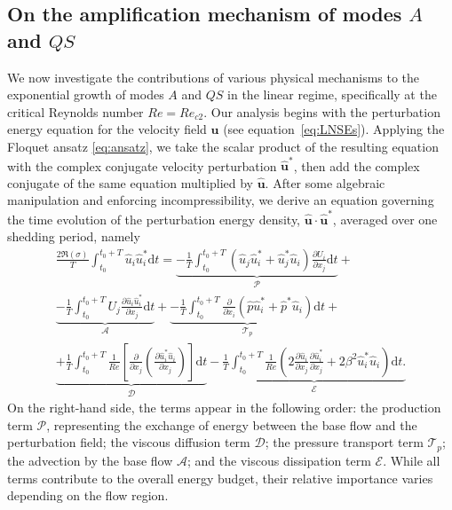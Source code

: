 \subsection{On the amplification mechanism of modes $A$ and $QS$}

We now investigate the contributions of various physical mechanisms to the exponential growth of modes $A$ and $QS$ in the linear regime, specifically at the critical Reynolds number $Re = Re_{c2}$. Our analysis begins with the perturbation energy equation for the velocity field $\bm{u}$ (see equation~\eqref{eq:LNSEs}). Applying the Floquet ansatz \eqref{eq:ansatz}, we take the scalar product of the resulting equation with the complex conjugate velocity perturbation $\hat{\bm{u}}^*$, then add the complex conjugate of the same equation multiplied by $\hat{\bm{u}}$. After some algebraic manipulation and enforcing incompressibility, we derive an equation governing the time evolution of the perturbation energy density, $\hat{\bm{u}} \cdot \hat{\bm{u}}^*$, averaged over one shedding period, namely
%
\begin{equation}
  \begin{gathered}
  \frac{2 \Re(\sigma)}{T} \int_{t_0}^{t_0+T} \hat{u}_i \hat{u}_i^* \text{d}t = 
 \underbrace{-\frac{1}{T} \int_{t_0}^{t_0+T} \left( \hat{u}_j \hat{u}_i^* + \hat{u}_j^* \hat{u}_i \right) \frac{\partial U_i}{\partial x_j} \text{d} t}_{\mathcal{P}} +\\
 \underbrace{-\frac{1}{T} \int_{t_0}^{t_0+T} U_j \frac{\partial \hat{u}_i \hat{u}_i^*}{\partial x_j} \text{d} t }_{\mathcal{A}} + 
 \underbrace{-\frac{1}{T} \int_{t_0}^{t_0+T} \frac{\partial}{\partial x_i} \left( \hat{p} \hat{u}_i^* + \hat{p}^* \hat{u}_i \right) \text{d}t }_{\mathcal{T}_p}+ \\
\underbrace{ +\frac{1}{T} \int_{t_0}^{t_0+T} \frac{1}{Re} \left[ \frac{\partial}{\partial x_j} \left( \frac{\partial \hat{u}_i^* \hat{u}_i }{\partial x_j} \right) \right] \text{d}t }_{\mathcal{D} }
 - \underbrace{ \frac{1}{T} \int_{t_0}^{t_0+T} \frac{1}{Re} \left( 2 \frac{\partial \hat{u}_i}{\partial x_j} \frac{\partial \hat{u}_i^*}{\partial x_j} + 2 \beta^2 \hat{u}_i^* \hat{u}_i \right) \text{d} t. }_{\mathcal{E}}
 \end{gathered}
\end{equation}
%
On the right-hand side, the terms appear in the following order: the production term $\mathcal{P}$, representing the exchange of energy between the base flow and the perturbation field; the viscous diffusion term $\mathcal{D}$; the pressure transport term $\mathcal{T}_p$; the advection by the base flow $\mathcal{A}$; and the viscous dissipation term $\mathcal{E}$. While all terms contribute to the overall energy budget, their relative importance varies depending on the flow region.

